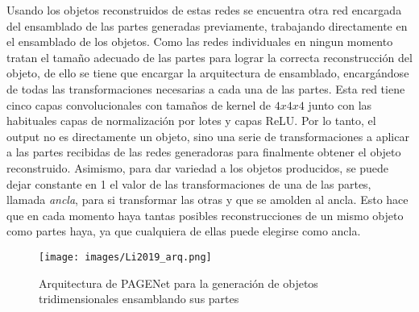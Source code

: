 \documentclass[spanish]{article}
\begin{document}
Usando los objetos reconstruidos de estas redes se encuentra otra red
encargada del ensamblado de las partes generadas previamente,
trabajando directamente en el ensamblado de los objetos.
Como las redes individuales en ningun momento tratan el tamaño
adecuado de las partes para lograr la correcta
reconstrucción del objeto, de ello se tiene que encargar la
arquitectura de ensamblado, encargándose de todas las
transformaciones necesarias a cada una de las partes. Esta
red tiene cinco capas convolucionales con tamaños de
kernel de \(4x4x4\) junto con las habituales capas de normalización
por lotes y capas ReLU. Por lo tanto, el output no es directamente
un objeto, sino una serie de transformaciones a aplicar a
las partes recibidas de las redes generadoras para finalmente obtener
el objeto reconstruido. Asimismo, para dar variedad a los objetos
producidos, se puede dejar constante en 1 el valor de las
transformaciones de una de las partes, llamada \textit{ancla}, para
si transformar las otras y que se amolden al ancla. Esto hace
que en cada momento haya tantas posibles reconstrucciones de un mismo
objeto como partes haya, ya que cualquiera de ellas puede elegirse
como ancla.


\begin{figure}[h]
\texttt{[image: images/Li2019\_arq.png]}
\centering
\caption{Arquitectura de PAGENet \cite{Li2019} para la generación de objetos tridimensionales ensamblando sus partes}
\label{PAGENet_arq}
\end{figure}
\end{document}
